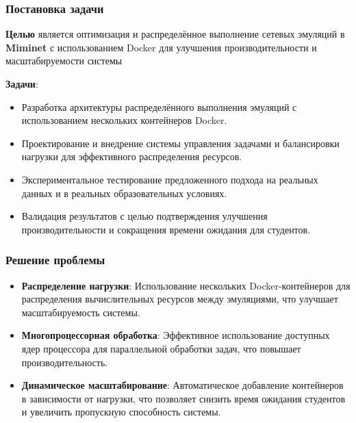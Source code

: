 \documentclass{beamer}
\begin{document}
\begin{frame}
  \frametitle{Постановка задачи}
  \textbf{Целью} является оптимизация и распределённое выполнение сетевых эмуляций в \textbf{Miminet} с использованием Docker для улучшения производительности и масштабируемости системы

  \textbf{Задачи}:
  \begin{itemize}
    \item Разработка архитектуры распределённого выполнения эмуляций с использованием нескольких контейнеров Docker.
    \item Проектирование и внедрение системы управления задачами и балансировки нагрузки для эффективного распределения ресурсов.
    \item Экспериментальное тестирование предложенного подхода на реальных данных и в реальных образовательных условиях.
    \item Валидация результатов с целью подтверждения улучшения производительности и сокращения времени ожидания для студентов.
\end{itemize}
\end{frame}

\begin{frame}[fragile]
  \frametitle{Решение проблемы}
  \begin{itemize}
    \item \textbf{Распределение нагрузки}: Использование нескольких Docker-контейнеров для распределения вычислительных ресурсов между эмуляциями, что улучшает масштабируемость системы.
    \item \textbf{Многопроцессорная обработка}: Эффективное использование доступных ядер процессора для параллельной обработки задач, что повышает производительность.
    \item \textbf{Динамическое масштабирование}: Автоматическое добавление контейнеров в зависимости от нагрузки, что позволяет снизить время ожидания студентов и увеличить пропускную способность системы.
  \end{itemize}
\end{frame}
\end{document}

